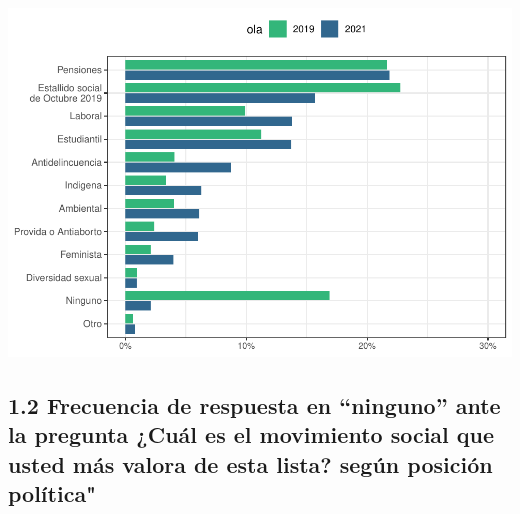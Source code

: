 \documentclass[
  12pt,
]{book}
\begin{document}
\includegraphics{reporte-elsoc_files/figure-latex/unnamed-chunk-6-1.pdf}

\hypertarget{frecuencia-de-respuesta-en-ninguno-ante-la-pregunta-cuuxe1l-es-el-movimiento-social-que-usted-muxe1s-valora-de-esta-lista-seguxfan-posiciuxf3n-poluxedtica}{%
\subsection{1.2 Frecuencia de respuesta en ``ninguno'' ante la pregunta ¿Cuál es el movimiento social que usted más valora de esta lista? según posición política"}\label{frecuencia-de-respuesta-en-ninguno-ante-la-pregunta-cuuxe1l-es-el-movimiento-social-que-usted-muxe1s-valora-de-esta-lista-seguxfan-posiciuxf3n-poluxedtica}}
\end{document}

